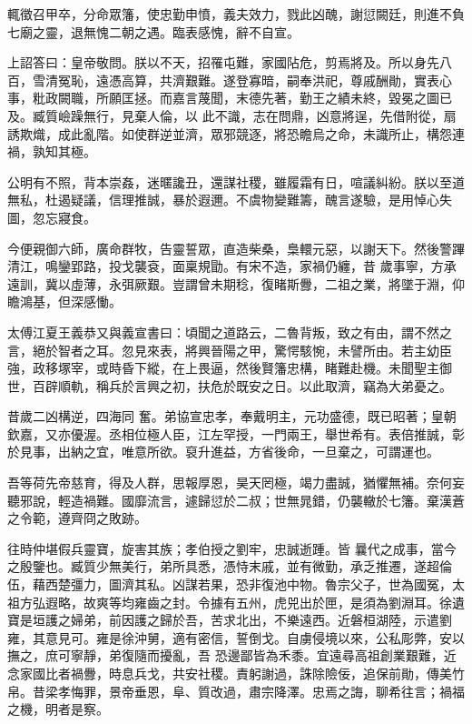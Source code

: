 \begin{pinyinscope}
 輒徵召甲卒，分命眾籓，使忠勤申憤，義夫效力，戮此凶醜，謝愆闕廷，則進不負七廟之靈，退無愧二朝之遇。臨表感愧，辭不自宣。



 上詔答曰：皇帝敬問。朕以不天，招罹屯難，家國阽危，剪焉將及。所以身先八百，雪清冤恥，遠憑高算，共濟艱難。遂登寡暗，嗣奉洪祀，尊戚酬勛，實表心事，粃政闕職，所願匡拯。而嘉言蔑聞，末德先著，勤王之績未終，毀冕之圖已及。臧質嶮躁無行，見棄人倫，以
 此不識，志在問鼎，凶意將逞，先借附從，扇誘欺熾，成此亂階。如使群逆並濟，眾邪競逐，將恐瞻烏之命，未識所止，構怨連禍，孰知其極。



 公明有不照，背本崇姦，迷暱讒丑，還謀社稷，雖履霜有日，喧議糾紛。朕以至道無私，杜遏疑議，信理推誠，暴於遐邇。不虞物變難籌，醜言遂驗，是用悼心失圖，忽忘寢食。



 今便親御六師，廣命群牧，告靈誓眾，直造柴桑，梟轘元惡，以謝天下。然後警蹕清江，鳴鑾郢路，投戈襲袞，面稟規勖。有宋不造，家禍仍纏，昔
 歲事寧，方承遠訓，冀以虛薄，永弭厥艱。豈謂曾未期稔，復睹斯釁，二祖之業，將墜于淵，仰瞻鴻基，但深感慟。



 太傅江夏王義恭又與義宣書曰：頃聞之道路云，二魯背叛，致之有由，謂不然之言，絕於智者之耳。忽見來表，將興晉陽之甲，驚愕駭惋，未譬所由。若主幼臣強，政移塚宰，或時昏下縱，在上畏逼，然後賢籓忠構，睹難赴機。未聞聖主御世，百辟順軌，稱兵於言興之初，扶危於既安之日。以此取濟，竊為大弟憂之。



 昔歲二凶構逆，四海同
 奮。弟協宣忠孝，奉戴明主，元功盛德，既已昭著；皇朝欽嘉，又亦優渥。丞相位極人臣，江左罕授，一門兩王，舉世希有。表倍推誠，彰於見事，出納之宜，唯意所欲。裒升進益，方省後命，一旦棄之，可謂運也。



 吾等荷先帝慈育，得及人群，思報厚恩，昊天罔極，竭力盡誠，猶懼無補。奈何妄聽邪說，輕造禍難。國靡流言，遽歸愆於二叔；世無晁錯，仍襲轍於七籓。棄漢蒼之令範，遵齊冏之敗跡。



 往時仲堪假兵靈寶，旋害其族；孝伯授之劉牢，忠誠逝踵。皆
 曩代之成事，當今之殷鑒也。臧質少無美行，弟所具悉，憑恃末戚，並有微勤，承乏推遷，遂超倫伍，藉西楚彊力，圖濟其私。凶謀若果，恐非復池中物。魯宗父子，世為國冤，太祖方弘遐略，故爽等均雍齒之封。令據有五州，虎兕出於匣，是須為劉淵耳。徐遺寶是垣護之婦弟，前因護之歸於吾，苦求北出，不樂遠西。近磐桓湖陸，示遣劉雍，其意見可。雍是徐沖舅，適有密信，誓倒戈。自虜侵境以來，公私彫弊，安以撫之，庶可寧靜，弟復隨而擾亂，吾
 恐邊鄙皆為禾黍。宜遠尋高祖創業艱難，近念家國比者禍釁，時息兵戈，共安社稷。責躬謝過，誅除險佞，追保前勛，傳美竹帛。昔梁孝悔罪，景帝垂恩，阜、質改過，肅宗降澤。忠焉之誨，聊希往言；禍福之機，明者是察。




\end{pinyinscope}
